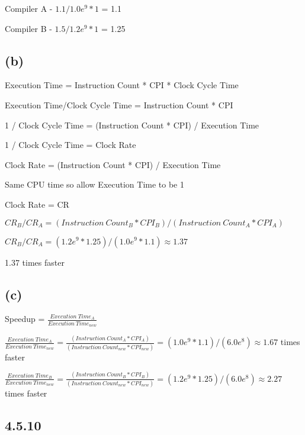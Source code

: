 \documentclass{article}
\begin{document}
    \vspace*{6pt}

    Compiler A - $1.1 / {1.0e^9 * 1}$ = 1.1

    Compiler B - $ 1.5 / {1.2e^9 * 1}$ = 1.25

    \subsection*{(b)}

    Execution Time = Instruction Count * CPI * Clock Cycle Time

    Execution Time/Clock Cycle Time = Instruction Count * CPI

    1 / Clock Cycle Time = (Instruction Count * CPI) / Execution Time

    1 / Clock Cycle Time = Clock Rate

    Clock Rate = (Instruction Count * CPI) / Execution Time

    Same CPU time so allow Execution Time to be 1 

    Clock Rate = CR

    \vspace*{6pt}

    $CR_B/CR_A = (Instruction\ Count_B * CPI_B)/(Instruction\ Count_A * CPI_A)$ 

    $CR_B/CR_A = (1.2e^9 * 1.25)/(1.0e^9 * 1.1) \approx 1.37$

    1.37 times faster

    \subsection*{(c)}

    Speedup = $\frac{Execution\ Time_A}{Execution\ Time_{new}}$

    \vspace*{6pt}
    
    $\frac{Execution\ Time_A}{Execution\ Time_{new}} = \frac{(Instruction\ Count_A * CPI_A)}{(Instruction\ Count_{new} * CPI_{new})} = (1.0e^9 * 1.1)/(6.0e^8) \approx 1.67$ times faster

    \vspace*{6pt}

    $\frac{Execution\ Time_B}{Execution\ Time_{new}} = \frac{(Instruction\ Count_B * CPI_B)}{(Instruction\ Count_{new} * CPI_{new})} = (1.2e^9 * 1.25)/(6.0e^8) \approx 2.27$ times faster

    \newpage

    \subsection*{4.5.10}
\end{document}
